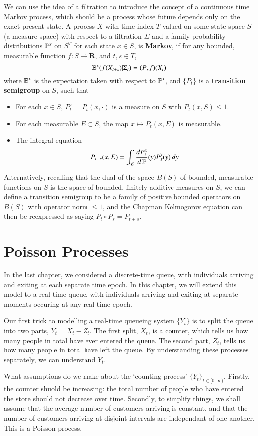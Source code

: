We can use the idea of a filtration to introduce the concept of a continuous time Markov process, which should be a process whose future depends only on the exact present state. A process $X$ with time index $T$ valued on some state space $S$ (a measure space) with respect to a filtration $\Sigma$ and a family probability distributions $\operatorname{\mathbb{P}}^x$ on $S^T$ for each state $x \in S$, is {\bf Markov}, if for any bounded, measurable function $f: S \to \mathbf{R}$, and $t,s \in T$,
%
\[ \operatorname{\mathbb{E}}^x(f(X_{t + s})|\Sigma_t) = (P_s f)(X_t) \]
%
where $\operatorname{\mathbb{E}}^x$ is the expectation taken with respect to $\operatorname{\mathbb{P}}^x$, and $\{ P_t \}$ is a {\bf transition semigroup} on $S$, such that
%
\begin{itemize}
    \item For each $x \in S$, $P_t^x = P_t(x,\cdot)$ is a measure on $S$ with $P_t(x,S) \leq 1$.
    \item For each measurable $E \subset S$, the map $x \mapsto P_t(x,E)$ is measurable.
    \item The integral equation
    \[ P_{t+s}(x,E) = \int_E \frac{dP_t^x}{d\operatorname{\mathbb{P}}}(y) P_s^y(y)\ dy \]
\end{itemize}
%
Alternatively, recalling that the dual of the space $B(S)$ of bounded, measurable functions on $S$ is the space of bounded, finitely additive measures on $S$, we can define a transition semigroup to be a family of positive bounded operators on $B(S)$ with operator norm $\leq 1$, and the Chapman Kolmogorov equation can then be reexpressed as saying $P_t \circ P_s = P_{t+s}$.


\section{Poisson Processes}

In the last chapter, we considered a discrete-time queue, with individuals arriving and exiting at each separate time epoch. In this chapter, we will extend this model to a real-time queue, with individuals arriving and exiting at separate moments occuring at any real time-epoch.

Our first trick to modelling a real-time queueing system $\{ Y_t \}$ is to split the queue into two parts, $Y_t = X_t - Z_t$. The first split, $X_t$, is a counter, which tells us how many people in total have ever entered the queue. The second part, $Z_t$, tells us how many people in total have left the queue. By understanding these processes separately, we can understand $Y_t$.

What assumptions do we make about the `counting process' $\{ Y_t \}_{t \in [0,\infty)}$. Firstly, the counter shuold be increasing: the total number of people who have entered the store should not decrease over time. Secondly, to simplify things, we shall assume that the average number of customers arriving is constant, and that the number of customers arriving at disjoint intervals are independant of one another. This is a Poisson process.

